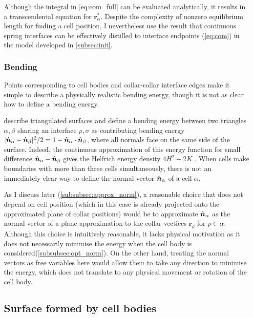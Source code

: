 Although the integral in \cref{eq:com_full} can be evaluated analytically, it results in a transcendental equation for $\bm{r}_\alpha^*$. 
Despite the complexity of nonzero equilibrium length for finding a cell position, I nevertheless use the result that continuous spring interfaces can be effectively distilled to interface endpoints (\cref{eq:com}) in the model developed in \cref{subsec:init}.

\subsubsection{Bending} \label{subsubsec:bending}

Points corresponding to cell bodies and collar-collar interface edges make it simple to describe a physically realistic bending energy, though it is not as clear how to define a bending energy.

\citet{seung1988} describe triangulated surfaces and define a bending energy between two triangles $\alpha,\beta$ sharing an interface $\rho, \sigma$ as contributing bending energy $|\hat{\bm{n}}_\alpha - \hat{\bm{n}}_\beta|^2/2 = 1 - \hat{\bm{n}}_\alpha \cdot \hat{\bm{n}}_\beta$, where all normals face on the same side of the surface. 
Indeed, the continuous approximation of this energy function for small difference $\hat{\bm{n}}_\alpha - \hat{\bm{n}}_\beta$ gives the Helfrich energy density $4H^2 - 2K$ \citep{helfrich1973}. 
When cells make boundaries with more than three cells simultaneously, there is not an immediately clear way to define the normal vector $\hat{\bm{n}}_\alpha$ of a cell $\alpha$. 

As I discuss later (\cref{subsubsec:approx_norm}), a reasonable choice that does not depend on cell position (which in this case is already projected onto the approximated plane of collar positions) would be to approximate $\hat{\bm{n}}_\alpha$ as the normal vector of a plane approximation to the collar vectices $\bm{r}_\rho$ for $\rho\in\alpha$. 
Although this choice is intuitively reasonable, it lacks physical motivation as it does not necessarily minimise the energy when the cell body is considered(\cref{subsubsec:opt_norm}).
On the other hand, treating the normal vectors as free variables here would allow them to take any direction to minimise the energy, which does not translate to any physical movement or rotation of the cell body. 

\subsection{Surface formed by cell bodies}

